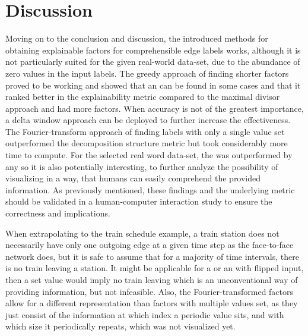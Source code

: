 
\chapter{Discussion}
\label{ch:Discussion}
Moving on to the conclusion and discussion, the introduced methods for obtaining explainable factors for comprehensible edge labels works, although it is not particularly suited for the given real-world data-set, due to the abundance of zero values in the input labels.
The greedy approach of finding shorter factors proved to be working and showed that an \orDecomp can be found in some cases and that it ranked better in the explainability metric compared to the maximal divisor approach and had more factors.
When accuracy is not of the greatest importance, a delta window approach can be deployed to further increase the effectiveness.
The Fourier-transform approach of finding labels with only a single value set outperformed the decomposition structure metric but took considerably more time to compute.
For the selected real word data-set, the \orDecomp was outperformed by any \andDecomp so it is also potentially interesting, to further analyze the possibility of visualizing \andDecomp in a way, that humans can easily comprehend the provided information.
As previously mentioned, these findings and the underlying metric should be validated in a human-computer interaction study to ensure the correctness and implications. 

When extrapolating to the train schedule example, a train station does not necessarily have only one outgoing edge at a given time step as the face-to-face network does, but it is safe to assume that for a majority of time intervals, there is no train leaving a station.
It might be applicable for a \andDecomp or an \orDecomp with flipped input, then a set value would imply no train leaving which is an unconventional way of providing information, but not infeasible.
Also, the Fourier-transformed factors allow for a different representation than factors with multiple values set, as they just consist of the information at which index a periodic value sits, and with which size it periodically repeats, which was not visualized yet.



